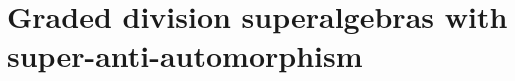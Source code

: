 \documentclass{amsbook}
\begin{document}













\section{Graded division superalgebras with super-anti-automorphism}
\end{document}
